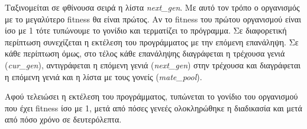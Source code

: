 \documentclass{article}
\begin{document}
Ταξινομείται σε φθίνουσα σειρά η λίστα \emph{next\_gen}. Με αυτό τον τρόπο ο
οργανισμός με το μεγαλύτερο fitness θα είναι πρώτος. Αν το fitness του πρώτου
οργανισμού είναι ίσο με 1 τότε τυπώνουμε το γονίδιο και τερματίζει το πρόγραμμα.
Σε διαφορετική περίπτωση συνεχίζεται η εκτέλεση του προγράμματος με την επόμενη
επανάληψη. Σε κάθε περίπτωση όμως, στο τέλος κάθε επανάληψης διαγράφεται η
τρέχουσα γενιά (\emph{cur\_gen}), αντιγράφεται η επόμενη γενιά
(\emph{next\_gen}) στην τρέχουσα και διαγράφεται η επόμενη γενιά και η λίστα με
τους γονείς (\emph{mate\_pool}).

Αφού τελειώσει η εκτέλεση του προγράμματος, τυπώνεται το γονίδιο του οργανισμού
που έχει fitness ίσο με 1, μετά από πόσες γενεές ολοκληρώθηκε η διαδικασία και
μετά από πόσο χρόνο σε δευτερόλεπτα.
\end{document}
